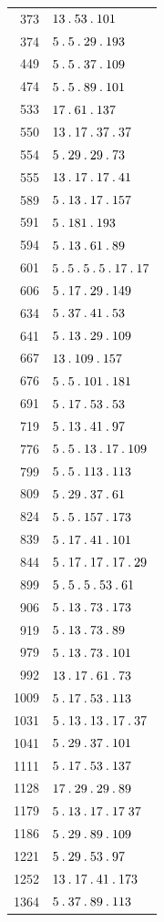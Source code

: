 \begin{longtable}{@{}r|l@{}}
373 & $13\mathbin{.} 53\mathbin{.} 101$\\
374 & $5\mathbin{.} 5\mathbin{.} 29\mathbin{.} 193$\\
449 & $5\mathbin{.} 5\mathbin{.} 37\mathbin{.} 109$\\
474 & $5\mathbin{.} 5\mathbin{.} 89\mathbin{.} 101$\\
533 & $17\mathbin{.} 61\mathbin{.} 137$\\
550 & $13\mathbin{.} 17\mathbin{.} 37\mathbin{.} 37$\\
554 & $5\mathbin{.} 29\mathbin{.} 29\mathbin{.} 73$\\
555 & $13\mathbin{.} 17\mathbin{.} 17\mathbin{.} 41$\\
589 & $5\mathbin{.} 13\mathbin{.} 17\mathbin{.} 157$\\
591 & $5\mathbin{.} 181\mathbin{.} 193$\\
594 & $5\mathbin{.} 13\mathbin{.} 61\mathbin{.} 89$\\
601 & $5\mathbin{.} 5\mathbin{.} 5\mathbin{.} 5\mathbin{.} 17\mathbin{.} 17$\\
606 & $5\mathbin{.} 17\mathbin{.} 29\mathbin{.} 149$\\
634 & $5\mathbin{.} 37\mathbin{.} 41\mathbin{.} 53$\\
641 & $5\mathbin{.} 13\mathbin{.} 29\mathbin{.} 109$\\
667 & $13\mathbin{.} 109\mathbin{.} 157$\\
676 & $5\mathbin{.} 5\mathbin{.} 101\mathbin{.} 181$\\
691 & $5\mathbin{.} 17\mathbin{.} 53\mathbin{.} 53$\\
719 & $5\mathbin{.} 13\mathbin{.} 41\mathbin{.} 97$\\
776 & $5\mathbin{.} 5\mathbin{.} 13\mathbin{.} 17\mathbin{.} 109$\\
799 & $5\mathbin{.} 5\mathbin{.} 113\mathbin{.} 113$\\
809 & $5\mathbin{.} 29\mathbin{.} 37\mathbin{.} 61$\\
824 & $5\mathbin{.} 5\mathbin{.} 157\mathbin{.} 173$\\
839 & $5\mathbin{.} 17\mathbin{.} 41\mathbin{.} 101$\\
844 & $5\mathbin{.} 17\mathbin{.} 17\mathbin{.} 17\mathbin{.} 29$\\
899 & $5\mathbin{.} 5\mathbin{.} 5\mathbin{.} 53\mathbin{.} 61$\\
906 & $5\mathbin{.} 13\mathbin{.} 73\mathbin{.} 173$\\
919 & $5\mathbin{.} 13\mathbin{.} 73\mathbin{.} 89$\\
979 & $5\mathbin{.} 13\mathbin{.} 73\mathbin{.} 101$\\
992 & $13\mathbin{.} 17\mathbin{.} 61\mathbin{.} 73$\\
1009 & $5\mathbin{.} 17\mathbin{.} 53\mathbin{.} 113$\\
1031 & $5\mathbin{.} 13\mathbin{.} 13\mathbin{.} 17\mathbin{.} 37$\\
1041 & $5\mathbin{.} 29\mathbin{.} 37\mathbin{.} 101$\\
1111 & $5\mathbin{.} 17\mathbin{.} 53\mathbin{.} 137$\\
1128 & $17\mathbin{.} 29\mathbin{.} 29\mathbin{.} 89$\\
1179 & $5\mathbin{.} 13\mathbin{.} 17\mathbin{.} 17\;37$\\
1186 & $5\mathbin{.} 29\mathbin{.} 89\mathbin{.} 109$\\
1221 & $5\mathbin{.} 29\mathbin{.} 53\mathbin{.} 97$\\
1252 & $13\mathbin{.} 17\mathbin{.} 41\mathbin{.} 173$\\
1364 & $5\mathbin{.} 37\mathbin{.} 89\mathbin{.} 113$\\
\end{longtable}\endgroup
